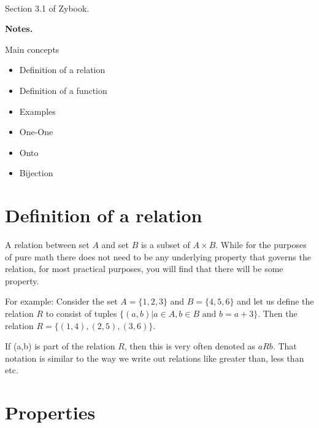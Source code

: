 \documentclass[12pt]{article}
\begin{document}
\begin{center}
\\
\vspace{1cm}
\end{center}


\medskip\noindent

Section 3.1 of Zybook.
	

{\bf Notes.}

Main concepts

\begin{itemize}
\item Definition of a relation
\item Definition of a function
\item Examples
\item One-One
\item Onto
\item Bijection
\end{itemize}

\vspace{0.5cm}\noindent

\section*{Definition of a relation}

A relation between set $A$ and set $B$ is a subset of $A \times B$. While for the purposes of pure math there does not need to be any underlying property that governs the relation, for most practical purposes, you will find that there will be some property.

For example: Consider the set $A = \{1,2,3\}$ and $B = \{4,5,6\}$ and let us define the relation $R$ to consist of tuples $\{(a,b)| a \in A, b \in B \text{ and } b = a + 3\}$.
Then the relation $R = \{(1,4) , (2,5), (3,6)\}$.

If (a,b) is part of the relation $R$, then this is very often denoted as $aRb$.
That notation is similar to the way we write out relations like greater than, less than etc.

\section*{Properties}
\end{document}
